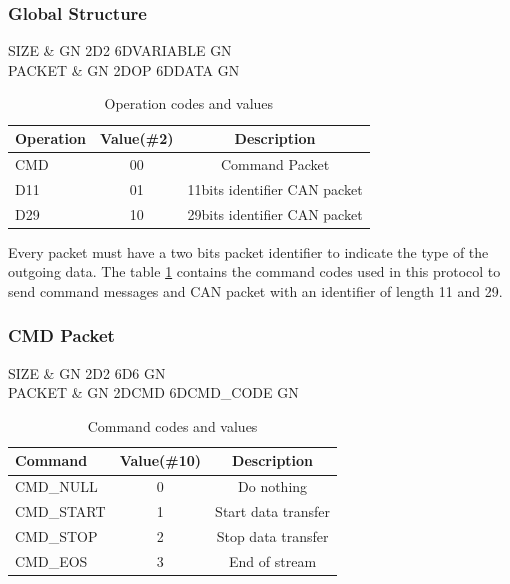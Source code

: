 \documentclass[11pt]{report} %
\begin{document}
			\subsubsection{Global Structure}
				\begin{tikztimingtable}
				SIZE	 & GN 2D{2} 6D{VARIABLE} GN \\
				PACKET	 & GN 2D{OP} 6D{DATA} GN \\
				\end{tikztimingtable}

				\begin{table}[h]
				\centering
				\caption{Operation codes and values}
				\begin{tabular}{| l | c | c |}
				\hline
				Operation & Value(\#2) & Description \\
				\hline\hline
				CMD	& 00 & Command Packet \\
				D11 & 01 & 11bits identifier CAN packet \\
				D29 & 10 & 29bits identifier CAN packet \\
				\hline
				\end{tabular}
				\label{tab:global_struct}
				\end{table}

				\indent Every packet must have a two bits packet identifier to indicate
				the type of the outgoing data. The table \ref{tab:global_struct}
				contains the command codes used in this protocol to send command
				messages and CAN packet with an identifier of length 11 and 29.

			\subsubsection{CMD Packet}
				\begin{tikztimingtable}
				SIZE	 & GN 2D{2} 6D{6} GN \\
				PACKET	 & GN 2D{CMD} 6D{CMD\_CODE} GN \\
				\end{tikztimingtable}

				\begin{table}[h]
				\centering
				\caption{Command codes and values}
				\begin{tabular}{| l | c | c |}
				\hline
				Command & Value(\#10) & Description \\
				\hline\hline
				CMD\_NULL & 0 & Do nothing \\
				CMD\_START & 1 & Start data transfer \\
				CMD\_STOP & 2 & Stop data transfer \\
				CMD\_EOS & 3 & End of stream \\
				\hline
				\end{tabular}
				\label{tab:cmd_codes}
				\end{table}
\end{document}

